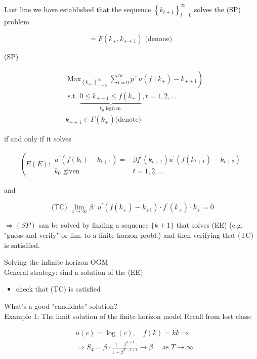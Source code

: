 \documentclass[10pt]{article}
\begin{document}
Last line we have established that the sequence $\left\{k_{t+1}\right\}_{t=0}^{\infty}$ solves the (SP) problem

$$
=F\left(k_{+}, k_{++1}\right) \text { (denone) }
$$

(SP)

$$
\begin{aligned}
& \left.\operatorname{Max}_{\left\{k_{+1}\right\}_{+=0}^{\infty}} \sum_{t=0}^{\infty} p^{+} u\left(f \mid k_{+}\right)-k_{++1}\right) \\
& \text { s.t. } \underbrace{0 \leq k_{++1} \leq f\left(k_{+}\right)}_{k_{0} \text { isgiven }}, t=1,2, \ldots \\
& k_{++1} \in \Gamma\left(k_{+}\right) \text {(denote) }
\end{aligned}
$$

if and only if it solves

$$
\begin{gathered}
\left(E(E): \begin{array}{cc}
u^{\prime}\left(f\left(k_{t}\right)-k_{t+1}\right)= & \beta f^{\prime}\left(k_{t+1}\right) u^{\prime}\left(f\left(k_{t+1}\right)-k_{t+2}\right) \\
k_{0} \text { given } & t=1,2, \ldots
\end{array}\right.
\end{gathered}
$$

and

$$
\text { (TC) } \lim _{x \rightarrow \infty} \beta^{+} u^{\prime}\left(f\left(k_{+}\right)-k_{+1}\right) \cdot f^{\prime}\left(k_{+}\right) \cdot k_{+}=0
$$

$\Rightarrow(S P)$ san be solved by finding a sequence $\{k+1\}$ that solves (EE) (e.g. "guess and verify" or lim. to a finite horzon probl.) and then verifying that (TC) is satisfiled.

Solving the infinite horizon OGM\\
General strategy: sind a solution of the (EE)

\begin{itemize}
  \item check that (TC) is satisfied
\end{itemize}

What's a good "candidate" solution?\\
Example 1: The limit solution of the finite horizon model Recall from lost class:

$$
\begin{aligned}
& u(c)=\log (c), \quad f(k)=k k \Rightarrow \\
& \Rightarrow S_{4}=\beta \cdot \frac{1-\beta^{T-t}}{1-\beta^{T-t+1}} \rightarrow \beta \quad \text { as } T \rightarrow \infty
\end{aligned}
$$
\end{document}
